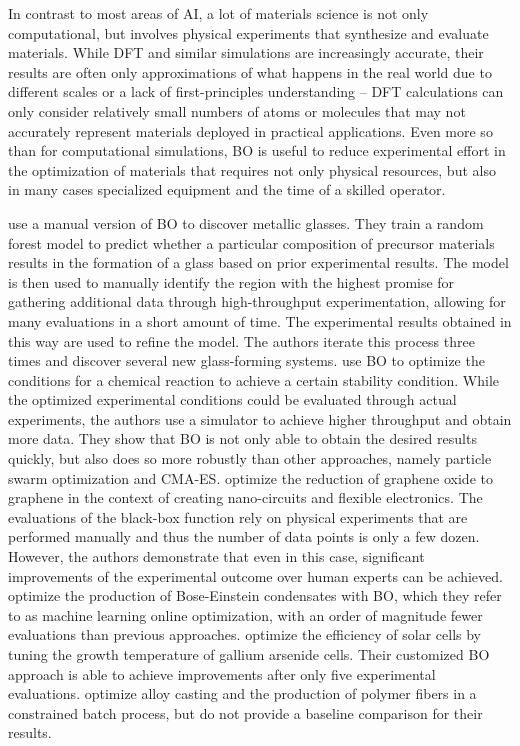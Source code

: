 \documentclass{article}
\begin{document}
In contrast to most areas of AI, a lot of materials science is not only
computational, but involves physical experiments that synthesize and evaluate
materials. While DFT and similar simulations are increasingly accurate, their
results are often only approximations of what happens in the real world due to
different scales or a lack of first-principles understanding -- DFT calculations
can only consider relatively small numbers of atoms or molecules that may not
accurately represent materials deployed in practical applications. Even more so
than for computational simulations, BO is useful to reduce experimental effort
in the optimization of materials that requires not only physical resources, but
also in many cases specialized equipment and the time of a skilled operator.

\cite{ren_accelerated_2018} use a manual version of BO to discover metallic
glasses. They train a random forest model to predict whether a particular
composition of precursor materials results in the formation of a glass based on
prior experimental results. The model is then used to manually identify the
region with the highest promise for gathering additional data through
high-throughput experimentation, allowing for many evaluations in a short amount
of time. The experimental results obtained in this way are used to refine the
model. The authors iterate this process three times and discover several new
glass-forming systems. \cite{hase_phoenics_2018} use BO to optimize the
conditions for a chemical reaction to achieve a certain stability condition.
While the optimized experimental conditions could be evaluated through actual
experiments, the authors use a simulator to achieve higher throughput and obtain
more data. They show that BO is not only able to obtain the desired results
quickly, but also does so more robustly than other approaches, namely particle
swarm optimization and CMA-ES. \cite{kotthoff_ai_2019} optimize the reduction of
graphene oxide to graphene in the context of creating nano-circuits and flexible
electronics. The evaluations of the black-box function rely on physical
experiments that are performed manually and thus the number of data points is
only a few dozen. However, the authors demonstrate that even in this case,
significant improvements of the experimental outcome over human experts can be
achieved. \cite{wigley_fast_2016} optimize the production of Bose-Einstein
condensates with BO, which they refer to as machine learning online
optimization, with an order of magnitude fewer evaluations than previous
approaches. \cite{ren_embedding_2020} optimize the efficiency of solar cells by
tuning the growth temperature of gallium arsenide cells. Their customized BO
approach is able to achieve improvements after only five experimental
evaluations. \cite{vellanki2017} optimize alloy casting and the production of
polymer fibers in a constrained batch process, but do not provide a baseline
comparison for their results.
\end{document}
